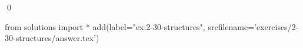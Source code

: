 
\begin{ex}
  \label{ex:2-30-structures}
  
  \qed
\end{ex}
\begin{python0}
from solutions import *
add(label="ex:2-30-structures",
    srcfilename='exercises/2-30-structures/answer.tex')
\end{python0}

